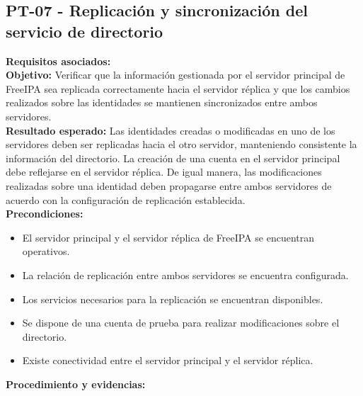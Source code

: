\subsection{PT-07 - Replicación y sincronización del servicio de directorio}\label{subsec:pt07}
\textbf{Requisitos asociados:}\\
\textbf{Objetivo:} Verificar que la información gestionada por el servidor principal de FreeIPA sea replicada correctamente hacia el servidor réplica y que los cambios realizados sobre las identidades se mantienen sincronizados entre ambos servidores.\\
\textbf{Resultado esperado:} Las identidades creadas o modificadas en uno de los servidores deben ser replicadas hacia el otro servidor, manteniendo consistente la información del directorio.
La creación de una cuenta en el servidor principal debe reflejarse en el servidor réplica. De igual manera, las modificaciones realizadas sobre una identidad deben propagarse entre ambos servidores de acuerdo con la configuración de replicación establecida.\\
\textbf{Precondiciones:}
\begin{itemize}
	\item El servidor principal y el servidor réplica de FreeIPA se encuentran operativos.
	\item La relación de replicación entre ambos servidores se encuentra configurada.
	\item Los servicios necesarios para la replicación se encuentran disponibles.
	\item Se dispone de una cuenta de prueba para realizar modificaciones sobre el directorio.
	\item Existe conectividad entre el servidor principal y el servidor réplica.
\end{itemize}
\textbf{Procedimiento y evidencias:}
